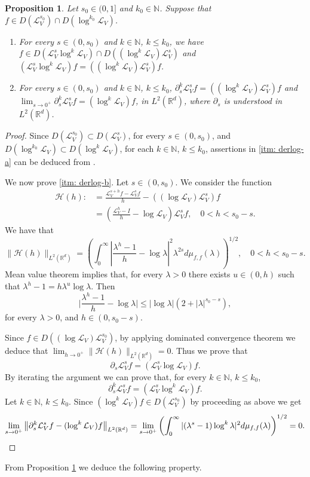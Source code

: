 \documentclass[10pt, a4paper, reqno]{amsart}
\newtheorem{prop}[thm]{Proposition}
\theoremstyle{definition}
\theoremstyle{remark}
\numberwithin{equation}{section}
\begin{document}
\begin{prop}\label{derlog} Let $s_0\in (0,1]$ and $k_0\in \mathbb{N}$. Suppose that $f\in D(\mathcal{L}_V^{s_0})\cap D(\log^{k_0}\mathcal{L}_V)$. 
\begin{enumerate}[label=\textnormal{(\alph*)}]
\item \label{itm: derlog-a} For every $s\in (0,s_0)$ and $k\in \mathbb{N}$, $k\le k_0$, we have $f\in D(\mathcal{L}_V^s\log^k\mathcal{L}_V)\cap D((\log^k\mathcal{L}_V)\mathcal{L}_V^s)$ and $(\mathcal{L}_V^s\log^k\mathcal{L}_V)f=((\log^k\mathcal{L}_V)\mathcal{L}_V^s)f$.
 
\item \label{itm: derlog-b} For every $s\in (0,s_0)$ and $k\in \mathbb{N}$, $k\le k_0$, $\partial_s^k\mathcal{L}_V^sf=((\log^k\mathcal{L}_V)\mathcal{L}_V^s)f$ and $\lim_{s\to 0^+}\partial_s^k\mathcal{L}_V^sf=(\log^k\mathcal L_V)f$, in $L^2(\mathbb{R}^d)$, where $\partial_s$ is understood in $L^2(\mathbb{R}^d)$.
\end{enumerate}
\end{prop}

\begin{proof}
  Since $D(\mathcal{L}_V^{s_0})\subset D(\mathcal{L}_V^s)$, for every $s\in (0,s_0)$, and $D(\log^{k_0}\mathcal{L}_V)\subset D(\log^k\mathcal{L}_V)$, for each $k\in \mathbb{N}$, $k\le k_0$, assertions in \ref{itm: derlog-a} can be deduced from \cite[Theorem 3(iv), p. 343]{Yo}.

  We now prove \ref{itm: derlog-b}. Let $s\in (0,s_0)$. We consider the function 
  \begin{align*}
  \mathcal H(h):&=\frac{\mathcal{L}_V^{s+h}f-\mathcal{L}_V^sf}{h}-((\log\mathcal{L}_V)\mathcal {L}_V^s)f\\
  &= \left(\frac{\mathcal {L}_V^h-I}{h}-\log\mathcal{L}_V\right)\mathcal{L}_V^sf, \quad 0<h<s_0-s.
      \end{align*}
We have that
\[
\|\mathcal{H}(h)\|_{L^2(\mathbb {R}^d)}=\left(\int_0^\infty\left|\frac{\lambda^h-1}{h}-\log\lambda\right|^2\lambda^{2s}d\mu_{f,f}(\lambda)\right)^{1/2}, \quad 0<h<s_0-s.
\]
Mean value theorem implies that, for every $\lambda>0$ there exists $u\in (0,h) $ such that $\lambda^h-1=h\lambda^u\log\lambda$. Then 
\[
\Big|\frac{\lambda^h-1}{h}-\log\lambda\Big|\le |\log\lambda|(2+|\lambda|^{s_0-s}),
\]
for every $\lambda>0$, and $h\in (0,s_0-s)$.

Since $f\in D((\log\mathcal{L}_V)\mathcal{L}_V^{s_0})$, by applying dominated convergence theorem we deduce that $\lim_{h\to 0^+}\|\mathcal H(h)\|_{L^2(\mathbb{R}^d)}=0$. Thus we prove that
\[
\partial_s\mathcal{L}_V^sf=(\mathcal{L}_V^s\log\mathcal{L}_V)f.
\]
By iterating the argument we can prove that, for every $k\in \mathbb{N}$, $k\le k_0$,
\[
\partial_s^k\mathcal{L}_V^sf=(\mathcal{L}_V^s\log^k\mathcal{L}_V)f.
\]
Let $k\in \mathbb{N}$, $k\le k_0$. Since $(\log^k\mathcal{L}_V)f\in D(\mathcal{L}_V^{s_0})$ by proceeding as above we get
\[
\lim_{s\rightarrow 0^+}\big\|\partial_s^k\mathcal{L}_V^sf-(\log^k\mathcal{L}_V)f\big\|_{L^2(\mathbb{R}^d)}=\lim_{s\rightarrow 0^+}\left(\int_0^\infty|(\lambda^s-1)\log^k\lambda|^2d\mu_{f,f}(\lambda)\right)^{1/2}=0.\qedhere\]
\end{proof}
From Proposition \ref{derlog} we deduce the following property.
\end{document}
